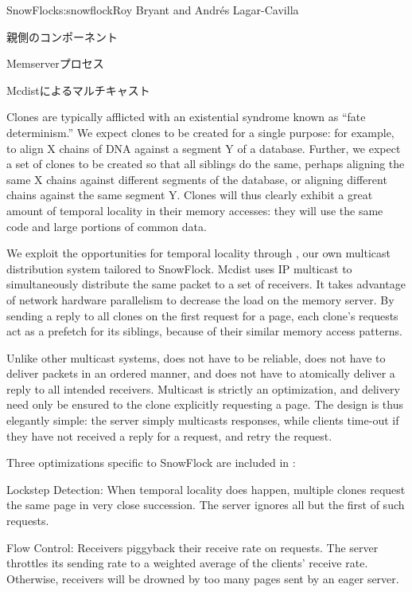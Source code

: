 \begin{aosachapter}{SnowFlock}{s:snowflock}{Roy Bryant and Andr\'e{s} Lagar-Cavilla}
\begin{aosasect1}{親側のコンポーネント}
\begin{aosasect2}{Memserverプロセス}
\end{aosasect2}

\begin{aosasect2}{Mcdistによるマルチキャスト}

Clones are typically afflicted with an existential syndrome known as
``fate determinism.'' We expect clones to be created for a single
purpose: for example, to align X chains of DNA against a segment Y of
a database. Further, we expect a set of clones to be created so that
all siblings do the same, perhaps aligning the same X chains against
different segments of the database, or aligning different chains
against the same segment Y\@. Clones will thus clearly exhibit a great
amount of temporal locality in their memory accesses: they will use
the same code and large portions of common data.

We exploit the opportunities for temporal locality through , our
own multicast distribution system tailored to SnowFlock. Mcdist uses
IP multicast to simultaneously distribute the same packet to a set of
receivers. It takes advantage of network hardware parallelism to
decrease the load on the memory server. By sending a reply to all
clones on the first request for a page, each clone's requests act as a
prefetch for its siblings, because of their similar memory access
patterns.

Unlike other multicast systems,  does not have to be reliable,
does not have to deliver packets in an ordered manner, and does not
have to atomically deliver a reply to all intended
receivers. Multicast is strictly an optimization, and delivery need
only be ensured to the clone explicitly requesting a page. The design
is thus elegantly simple: the server simply multicasts responses,
while clients time-out if they have not received a reply for a
request, and retry the request.

Three optimizations specific to SnowFlock are included in :

\begin{aosaitemize}

  \item Lockstep Detection: When temporal locality does happen,
  multiple clones request the same page in very close
  succession. The  server ignores all but the first of such
  requests.

  \item Flow Control: Receivers piggyback their receive rate on
  requests.  The server throttles its sending rate to a weighted
  average of the clients' receive rate. Otherwise, receivers will be
  drowned by too many pages sent by an eager server.


\end{aosaitemize}
\end{aosasect2}
\end{aosasect1}
\end{aosachapter}
